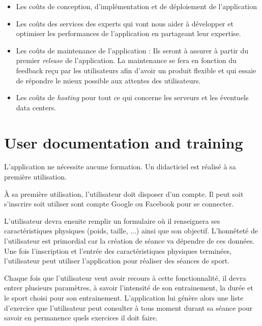 \begin{itemize}

\item Les coûts de conception, d'implémentation et de déploiement de l'application

\item Les coûts des services des experts qui vont nous aider à développer et optimiser les performances de l'application en partageant leur expertise.

\item Les coûts de maintenance de l'application : Ils seront à assurer à partir du premier \textit{release} de l'application. La maintenance se fera en fonction du feedback reçu par les utilisateurs afin d'avoir un produit flexible et qui essaie de répondre le mieux possible aux attentes des utilisateurs.

\item Les coûts de \textit{hosting} pour tout ce qui concerne les serveurs et les éventuels data centers.

\end{itemize}

\section{User documentation and training}

L'application ne nécessite aucune formation. Un didacticiel est réalisé à sa première utilisation.

À sa première utilisation, l'utilisateur doit disposer d'un compte. Il peut soit s'inscrire soit utiliser sont compte Google ou Facebook pour se connecter.

L'utilisateur devra ensuite remplir un formulaire où il renseignera ses caractéristiques physiques (poids, taille, ...) ainsi que son objectif. L'honnêteté de l'utilisateur est primordial car la création de séance va dépendre de ces données. Une fois l'inscription et l'entrée des caractéristiques physiques terminées, l'utilisateur peut utiliser l'application pour réaliser des séances de sport.

Chaque fois que l'utilisateur veut avoir recours à cette fonctionnalité, il devra entrer plusieurs paramètres, à savoir l'intensité de son entrainement, la durée et le sport choisi pour son entrainement. L'application lui génère alors une liste d'exercice que l'utilisateur peut  consulter à tous moment durant sa séance pour savoir en permanence quels exercices il doit faire.

